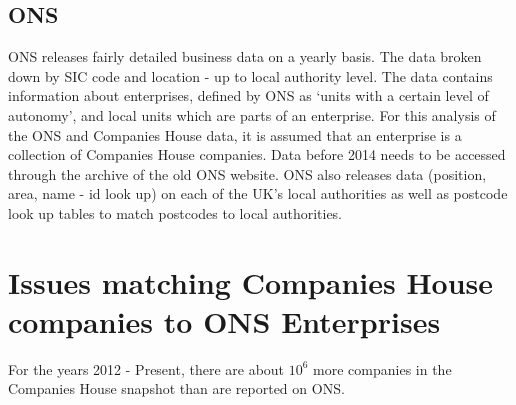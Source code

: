 \documentclass[a4paper,10pt]{article}
\begin{document}
\subsection{ONS}
ONS releases fairly detailed business data on a yearly basis. The data broken down by SIC code and location - up to local authority level. The data contains information about enterprises, defined by ONS as `units with a certain level of autonomy', and local units which are parts of an enterprise. For this analysis of the ONS and Companies House data, it is assumed that an enterprise is a collection of Companies House companies. Data before 2014 needs to be accessed through the archive of the old ONS website. ONS also releases data (position, area, name - id look up) on each of the UK's local authorities as well as postcode look up tables to match postcodes to local authorities.

\section{Issues matching Companies House companies to ONS Enterprises}
For the years 2012 - Present, there are about $10^6$ more companies in the Companies House snapshot than are reported on ONS.
\end{document}
